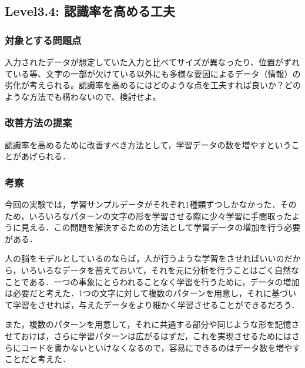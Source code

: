 \subsection{Level3.4: 認識率を高める工夫}
\subsubsection{対象とする問題点}
入力されたデータが想定していた入力と比べてサイズが異なったり、位置がずれている等、文字の一部が欠けている以外にも多様な要因によるデータ（情報）の劣化が考えられる。認識率を高めるにはどのような点を工夫すれば良いか？どのような方法でも構わないので、検討せよ。

\subsubsection{改善方法の提案}
認識率を高めるために改善すべき方法として，学習データの数を増やすということがあげられる．

\subsubsection{考察}
今回の実験では，学習サンプルデータがそれぞれ1種類ずつしかなかった．そのため，いろいろなパターンの文字の形を学習させる際に少々学習に手間取ったように見える．この問題を解決するための方法として学習データの増加を行う必要がある．

人の脳をモデルとしているのならば，人が行うような学習をさせればいいのだから，いろいろなデータを蓄えておいて，それを元に分析を行うことはごく自然なことである．一つの事象にとらわれることなく学習を行うために，データの増加は必要だと考えた．1つの文字に対して複数のパターンを用意し，それに基づいて学習をさせれば，与えたデータをより細かく学習させることができるだろう．

また，複数のパターンを用意して，それに共通する部分や同じような形を記憶させておけば，さらに学習パターンは広がるはずだ，これを実現させるためにはさらにコードを書かないといけなくなるので，容易にできるのはデータ数を増やすことだと考えた．
